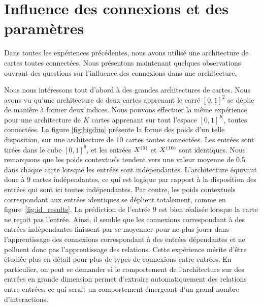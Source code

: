 \documentclass[../main]{subfiles}
\begin{document}
\section{Influence des connexions et des paramètres}

Dans toutes les expériences précédentes, nous avons utilisé une architecture de cartes toutes connectées. Nous présentons maintenant quelques observations ouvrant des questions sur l'influence des connexions dans une architecture.

Nous nous intéressons tout d'abord à des grandes architectures de cartes. Nous avons vu qu'une architecture de deux cartes apprenant le carré $[0,1]^2$ se déplie de manière à former deux indices. Nous pouvons effectuer la même expérience pour une architecture de $K$ cartes apprenant sur tout l'espace $[0,1]^K$, toutes connectées.
La figure \ref{fig:bigdim} présente la forme des poids d'un telle disposition, sur une architecture de 10 cartes toutes connectées. Les entrées sont tirées dans le cube $[0,1]^9$, et les entrées $X^{({9})}$ et $X^{({10})}$ sont identiques.
Nous remarquons que les poids contextuels tendent vers une valeur moyenne de 0.5 dans chaque carte lorsque les entrées sont indépendantes. L'architecture équivaut donc à 9 cartes indépendantes, ce qui est logique par rapport à la disposition des entrées qui sont ici toutes indépendantes. Par contre, les poids contextuels correspondant aux entrées identiques se déplient totalement, comme en figure~\ref{fig:id_results}. La prédiction de l'entrée $9$ est bien réalisée lorsque la carte ne reçoit pas l'entrée. Ainsi, il semble que les connexions correspondant à des entrées indépendantes finissent par se moyenner pour ne plus jouer dans l'apprentissage des connexions correspondant à des entrées dépendantes et ne polluent donc pas l'apprentissage des relations.
Cette expérience mérite d'être étudiée plus en détail pour plus de types de connexions entre entrées. 
En particulier, on peut se demander si le comportement de l'architecture sur des entrées en grande dimension permet d'extraire automatiquement des relations entre entrées, ce qui serait un comportement émergeant d'un grand nombre d'interactions.
\end{document}
